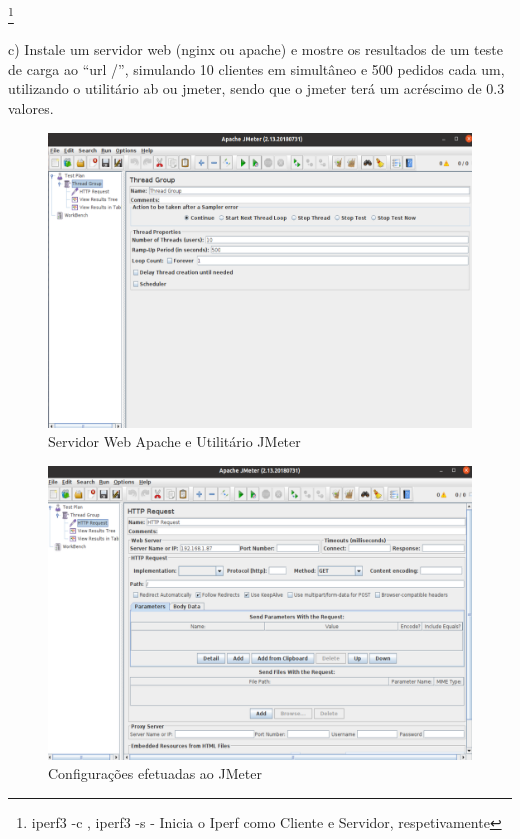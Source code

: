 \documentclass{article}
\begin{document}
	\footnote[1]{iperf3 -c , iperf3 -s  - Inicia o Iperf como Cliente e Servidor, respetivamente}
	
	\newpage
	c) Instale um servidor web (nginx ou apache) e mostre os resultados de um teste
	de carga ao “url /”, simulando 10 clientes em simultâneo e 500 pedidos cada
	um, utilizando o utilitário ab ou jmeter, sendo que o jmeter terá um acréscimo
	de 0.3 valores.
	\vspace{2 em}
	
	\begin{figure}[!htb]
		\centering
		\includegraphics[scale=0.6]{tp_sosd_c1}
		\caption{Servidor Web Apache e Utilitário JMeter}
	\end{figure}

	\newpage
	
	\begin{figure}[!htb]
		\centering
		\includegraphics[scale=0.6]{tp_sosd_c2}
		\caption{Configurações efetuadas ao JMeter}
	\end{figure}
	\newpage
	
\end{document}
